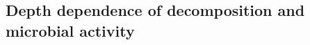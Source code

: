 \documentclass[11pt, oneside, a4paper]{article}   	%
\begin{document}


\subsection{Depth dependence of decomposition and microbial activity}
\end{document}
